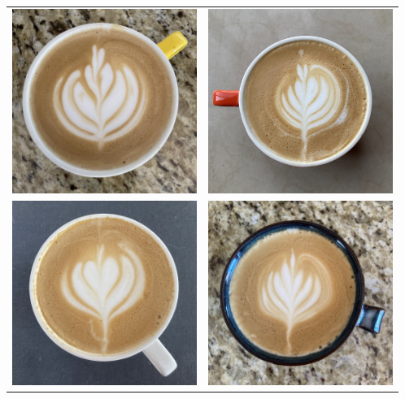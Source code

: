 \begin{center}
  \setlength{\tabcolsep}{10pt}
  \renewcommand{\arraystretch}{3.3}
  \begin{tabular}{cc}
    \includegraphics[width=6cm]{img/lattes/6-26.jpg} &
    \includegraphics[width=6cm]{img/lattes/6-29.jpg} \\
    \includegraphics[width=6cm]{img/lattes/7-08.jpg} &
    \includegraphics[width=6cm]{img/lattes/7-04.jpg} \\
  \end{tabular}
\end{center}
